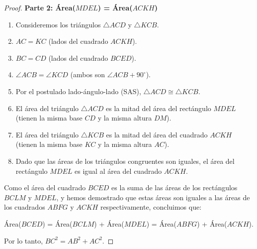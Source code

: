 \documentclass{article}
\theoremstyle{plain}
\newtheorem{proof}[theorem]{Demostración}
\begin{document}
\begin{proof}
\textbf{Parte 2: Área($MDEL$) = Área($ACKH$)}
\begin{enumerate}
    \item Consideremos los triángulos $\triangle ACD$ y $\triangle KCB$.
    \item $AC = KC$ (lados del cuadrado $ACKH$).
    \item $BC = CD$ (lados del cuadrado $BCED$).
    \item $\angle ACB = \angle KCD$ (ambos son $\angle ACB + 90^\circ$).
    \item Por el postulado lado-ángulo-lado (SAS), $\triangle ACD \cong \triangle KCB$.
    \item El área del triángulo $\triangle ACD$ es la mitad del área del rectángulo $MDEL$ (tienen la misma base $CD$ y la misma altura $DM$).
    \item El área del triángulo $\triangle KCB$ es la mitad del área del cuadrado $ACKH$ (tienen la misma base $KC$ y la misma altura $AC$).
    \item Dado que las áreas de los triángulos congruentes son iguales, el área del rectángulo $MDEL$ es igual al área del cuadrado $ACKH$.
\end{enumerate}

Como el área del cuadrado $BCED$ es la suma de las áreas de los rectángulos $BCLM$ y $MDEL$, y hemos demostrado que estas áreas son iguales a las áreas de los cuadrados $ABFG$ y $ACKH$ respectivamente, concluimos que:

Área($BCED$) = Área($BCLM$) + Área($MDEL$) = Área($ABFG$) + Área($ACKH$).

Por lo tanto, $BC^2 = AB^2 + AC^2$.
\end{proof}
\end{document}
